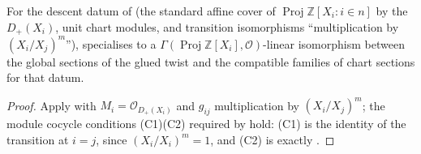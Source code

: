 \begin{lemma}
  \label{lem:serre_twist_glued_sections}
  \leanok
  For the descent datum of  (the standard affine cover
  of \(\operatorname{Proj} \mathbb Z[X_i : i \in n]\) by the \(D_+(X_i)\),
  unit chart modules, and transition isomorphisms ``multiplication by
  \((X_i/X_j)^m\)''),  specialises to a
  \(\Gamma(\operatorname{Proj}\mathbb Z[X_i], \mathcal O)\)-linear
  isomorphism between the global sections of the glued twist and the
  compatible families of chart sections for that datum.
\end{lemma}
\begin{proof}\leanok
  Apply  with \(M_i = \mathcal
  O_{D_+(X_i)}\) and \(g_{ij}\) multiplication by \((X_i/X_j)^m\); the
  module cocycle conditions (C1)(C2) required by
   hold: (C1) is the identity of the
  transition at \(i = j\), since \((X_i/X_i)^m = 1\), and (C2) is exactly
  .
\end{proof}

